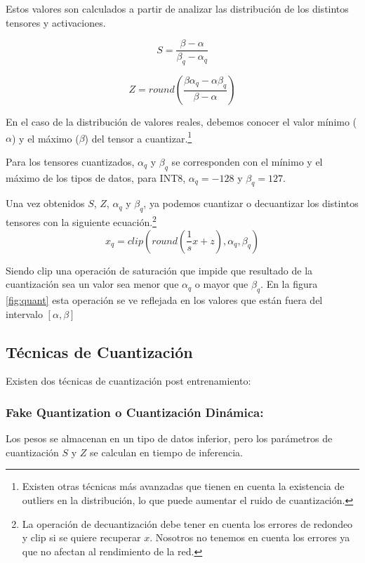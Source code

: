 Estos valores son calculados a partir de analizar las distribución de los distintos tensores y activaciones.

\begin{equation}
    S = \frac{\beta - \alpha}{\beta_q - \alpha_q}    
\end{equation}

\begin{equation}
    Z = round(\frac{\beta\alpha_q - \alpha\beta_q}{\beta-\alpha})
\end{equation}



En el caso de la distribución de valores reales, debemos conocer el valor mínimo
($\alpha$) y el máximo ($\beta$) del tensor a cuantizar.\footnote{Existen otras técnicas más avanzadas que tienen en cuenta la existencia de outliers en la distribución, lo que puede aumentar el ruido de cuantización.} 

Para los tensores cuantizados, $\alpha_q$ y $\beta_q$ se corresponden con el mínimo y el máximo de
los tipos de datos, para INT8,  $\alpha_q = -128$ y $\beta_q = 127$.

Una vez obtenidos $S$, $Z$, $\alpha_q$ y $\beta_q$, ya podemos cuantizar o decuantizar los distintos tensores con la siguiente ecuación.\footnote{La operación de decuantización debe tener en cuenta los errores de redondeo y clip si se quiere recuperar $x$. Nosotros no tenemos en cuenta los errores ya que no afectan al rendimiento de la red.}
\begin{equation}
    x_q = clip(round(\frac{1}{s}x + z), \alpha_q, \beta_q)
\end{equation}


Siendo clip una operación de saturación que impide que resultado de la cuantización sea un valor sea menor que $\alpha_q$ o mayor que $\beta_q$.
En la figura \ref{fig:quant} esta operación se ve reflejada en los valores que están fuera del intervalo $[\alpha,\beta]$


\hypertarget{tecnicas-de-cuantizacion}{%
\subsection{\texorpdfstring{Técnicas de Cuantización
}{Técnicas de Cuantización }}\label{tecnicas-de-cuantizacion}}
Existen dos técnicas de cuantización post entrenamiento:
\subsubsection{Fake Quantization o Cuantización Dinámica:}
Los pesos se almacenan en un tipo de datos inferior, pero los parámetros
de cuantización $S$ y $Z$ se calculan en tiempo de inferencia.
